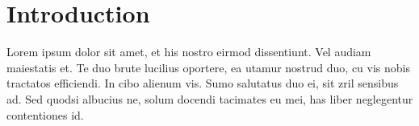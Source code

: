 \documentclass[11pt,article,oneside]{memoir}
\makeatletter
\def\myaffiliation{EPFL, Switzerland}
\def\myauthor{Heather Miller}
\def\myemail{\small{\texttt{\href{mailto:heather.miller@epfl.ch}{heather.miller@epfl.ch}}}}
\def\mytitle{Article Title}
\makeatother
\begin{document}
\setsansfont[Mapping=tex-text]{Minion Pro}
\setmonofont[Mapping=tex-text,Scale=MatchLowercase,BoldFont={Consolas Bold}]{Consolas}



\pagestyle{kjh}

\title{\bigskip \bigskip {{\mytitle}}}

\author{\myauthor \\
  \emph{\myaffiliation} \\ \myemail}%

\date{{\scriptsize{\texttt{}}}}




\maketitle

\thispagestyle{kjhgit}

\begin{abstract}
  \textit{Abstract:} And consider this an abstract.
\end{abstract}

%

\section{Introduction}

Lorem ipsum dolor sit amet, et his nostro eirmod dissentiunt. Vel audiam
maiestatis et. Te duo brute lucilius oportere, ea utamur nostrud duo, cu vis
nobis tractatos efficiendi. In cibo alienum vis. Sumo salutatus duo ei, sit zril
sensibus ad. Sed quodsi albucius ne, solum docendi tacimates eu mei, has liber
neglegentur contentiones id.
\end{document}
